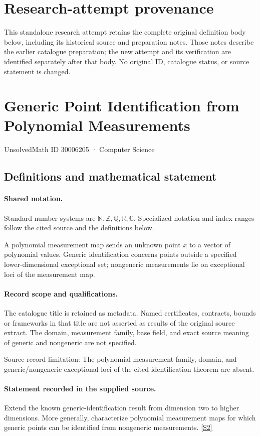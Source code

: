 \documentclass[11pt]{article}
\begin{document}
\section*{Research-attempt provenance}
This standalone research attempt retains the complete original definition body below,
including its historical source and preparation notes. Those notes describe the
earlier catalogue preparation; the new attempt and its verification are identified
separately after that body. No original ID, catalogue status, or source statement is changed.

\section{Generic Point Identification from Polynomial Measurements}\label{30006205}
{\small UnsolvedMath ID 30006205 · Computer Science}
\subsection{Definitions and mathematical statement}

\paragraph{Shared notation.}Standard number systems are $\mathbb N,\mathbb Z,\mathbb Q,\mathbb R,\mathbb C$. Specialized notation and index ranges follow the cited source and the definitions below.


A polynomial measurement map sends an unknown point $x$ to a vector of polynomial values. Generic identification concerns points outside a specified lower-dimensional exceptional set; nongeneric measurements lie on exceptional loci of the measurement map.
\paragraph{Record scope and qualifications.}
The catalogue title is retained as metadata. Named certificates, contracts, bounds or frameworks in that title are not asserted as results of the original source extract.
The domain, measurement family, base field, and exact source meaning of generic and nongeneric are not specified.

Source-record limitation: The polynomial measurement family, domain, and generic/nongeneric exceptional loci of the cited identification theorem are absent.
\paragraph{Statement recorded in the supplied source.}
Extend the known generic-identification result from dimension two to higher dimensions. More generally, characterize polynomial measurement maps for which generic points can be identified from nongeneric measurements. \href{https://doi.org/10.4171/owr/2025/9}{[S2]}
\end{document}
